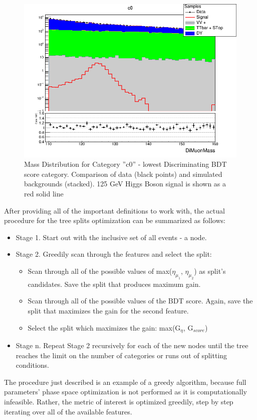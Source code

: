 \begin{figure}[htbp]
  \centering
  \includegraphics[width=0.9\linewidth]{figures/ch_higgs/distributions/bdt_uf/distribution__c0__DiMuonMass__logY.png}
  \caption{Mass Distribution for Category ''c0'' - lowest Discriminating BDT score category. Comparison of data (black points) and simulated backgrounds (stacked). 125 GeV Higgs Boson signal is shown as a red solid line}
  \label{fig:higgs_categorization_massc0}
\end{figure}

After providing all of the important definitions to work with, the actual procedure for the tree splits optimization can be summarized as follows:
\begin{itemize}
  \item Stage 1. Start out with the inclusive set of all events - a node.
  \item Stage 2. Greedily scan through the features and select the split:
    \begin{itemize}
      \item Scan through all of the possible values of max($\eta_{\mu_1}$, $\eta_{\mu_2}$) as split's candidates. Save the split that produces maximum gain.
      \item Scan through all of the possible values of the BDT score. Again, save the split that maximizes the gain for the second feature.
      \item Select the split which maximizes the gain: max(G$_\eta$, G$_{score}$)
    \end{itemize}
  \item Stage n. Repeat Stage 2 recursively for each of the new nodes until the tree reaches the limit on the number of categories or runs out of splitting conditions.
\end{itemize}
The procedure just described is an example of a greedy algorithm, because full parameters' phase space optimization is not performed as it is computationally infeasible. Rather, the metric of interest is optimized greedily, step by step iterating over all of the available features.

